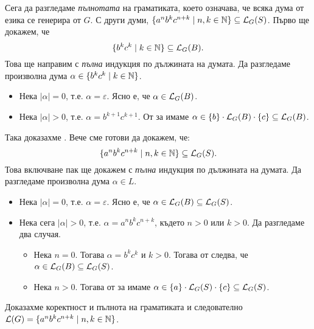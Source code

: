 \begin{extra}
\begin{example}
  Сега да разгледаме \emph{пълнотата} на граматиката, което означава, че
  всяка дума от езика се генерира от $G$. С други думи, $\{a^nb^kc^{n+k} \mid n,k\in\mathbb{N}\} \subseteq \mathcal{L}_G(S)$.
  Първо ще докажем, че
  \begin{equation}
    \label{eq:4}
      \{b^kc^k \mid k \in \mathbb{N}\} \subseteq \mathcal{L}_G(B).
    \end{equation}
    Това ще направим с \emph{пълна} индукция по дължината на думата.
    Да разгледаме произволна дума $\alpha \in \{b^kc^k \mid k \in \mathbb{N}\}$.
    \begin{itemize}
    \item
      Нека $|\alpha| = 0$, т.е. $\alpha = \varepsilon$.
      Ясно е, че $\alpha \in \mathcal{L}_G(B)$.
    \item
      Нека $|\alpha| > 0$, т.е. $\alpha = b^{k+1}c^{k+1}$.
      От \IndHyp за  имаме $\alpha \in \{b\} \cdot \mathcal{L}_G(B) \cdot \{c\} \subseteq \mathcal{L}_G(B)$.
    \end{itemize}
    Така доказахме .
    Вече сме готови да докажем, че:
    \begin{equation}
      \label{eq:9}
      \{a^nb^kc^{n+k} \mid n,k \in \mathbb{N}\} \subseteq \mathcal{L}_G(S).
    \end{equation}
    Това включване пак ще докажем с \emph{пълна} индукция по дължината на думата.
    Да разгледаме произволна дума $\alpha \in L$. 
    \begin{itemize}
    \item
      Нека $|\alpha| = 0$, т.е. $\alpha = \varepsilon$.
      Ясно е, че $\alpha \in \mathcal{L}_G(B) \subseteq \mathcal{L}_G(S)$.
    \item
      Нека сега $|\alpha| > 0$, т.е. $\alpha = a^nb^kc^{n+k}$, където $n > 0$ или $k > 0$. Да разгледаме два случая.
      \begin{itemize}
      \item
        Нека $n = 0$. Тогава $\alpha = b^kc^k$ и $k > 0$. Тогава от 
        следва, че $\alpha \in \mathcal{L}_G(B) \subseteq \mathcal{L}_G(S)$.
      \item                   
        Нека $n > 0$. Тогава от \IndHyp за  имаме
        $\alpha \in \{a\} \cdot \mathcal{L}_G(S) \cdot \{c\} \subseteq \mathcal{L}_G(S)$.
      \end{itemize}
    \end{itemize}
    Доказахме коректност и пълнота на граматиката и следователно $\mathcal{L}(G) = \{a^nb^kc^{n+k} \mid n,k\in\mathbb{N}\}$.
  \end{example}
  

\end{extra}
